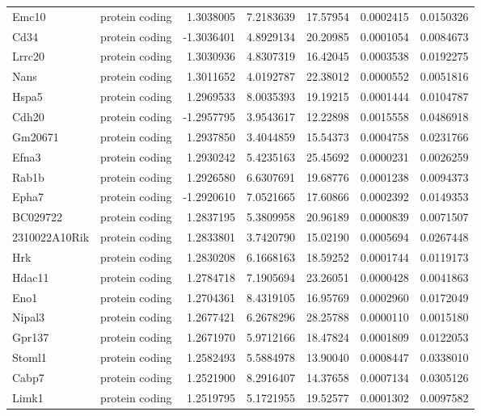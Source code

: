 \documentclass[onehalf,12pt]{beavtex}
\begin{document}
\begin{longtable}{llrrrrr}
  Emc10 & protein coding & 1.3038005 & 7.2183639 & 17.57954 & 0.0002415 & 0.0150326\\
  Cd34 & protein coding & -1.3036401 & 4.8929134 & 20.20985 & 0.0001054 & 0.0084673\\
  Lrrc20 & protein coding & 1.3030936 & 4.8307319 & 16.42045 & 0.0003538 & 0.0192275\\
  Nans & protein coding & 1.3011652 & 4.0192787 & 22.38012 & 0.0000552 & 0.0051816\\
  \addlinespace
  Hspa5 & protein coding & 1.2969533 & 8.0035393 & 19.19215 & 0.0001444 & 0.0104787\\
  Cdh20 & protein coding & -1.2957795 & 3.9543617 & 12.22898 & 0.0015558 & 0.0486918\\
  Gm20671 & protein coding & 1.2937850 & 3.4044859 & 15.54373 & 0.0004758 & 0.0231766\\
  Efna3 & protein coding & 1.2930242 & 5.4235163 & 25.45692 & 0.0000231 & 0.0026259\\
  Rab1b & protein coding & 1.2926580 & 6.6307691 & 19.68776 & 0.0001238 & 0.0094373\\
  \addlinespace
  Epha7 & protein coding & -1.2920610 & 7.0521665 & 17.60866 & 0.0002392 & 0.0149353\\
  BC029722 & protein coding & 1.2837195 & 5.3809958 & 20.96189 & 0.0000839 & 0.0071507\\
  2310022A10Rik & protein coding & 1.2833801 & 3.7420790 & 15.02190 & 0.0005694 & 0.0267448\\
  Hrk & protein coding & 1.2830208 & 6.1668163 & 18.59252 & 0.0001744 & 0.0119173\\
  Hdac11 & protein coding & 1.2784718 & 7.1905694 & 23.26051 & 0.0000428 & 0.0041863\\
  \addlinespace
  Eno1 & protein coding & 1.2704361 & 8.4319105 & 16.95769 & 0.0002960 & 0.0172049\\
  Nipal3 & protein coding & 1.2677421 & 6.2678296 & 28.25788 & 0.0000110 & 0.0015180\\
  Gpr137 & protein coding & 1.2671970 & 5.9712166 & 18.47824 & 0.0001809 & 0.0122053\\
  Stoml1 & protein coding & 1.2582493 & 5.5884978 & 13.90040 & 0.0008447 & 0.0338010\\
  Cabp7 & protein coding & 1.2521900 & 8.2916407 & 14.37658 & 0.0007134 & 0.0305126\\
  \addlinespace
  Limk1 & protein coding & 1.2519795 & 5.1721955 & 19.52577 & 0.0001302 & 0.0097582\\

\end{longtable}
\end{document}
